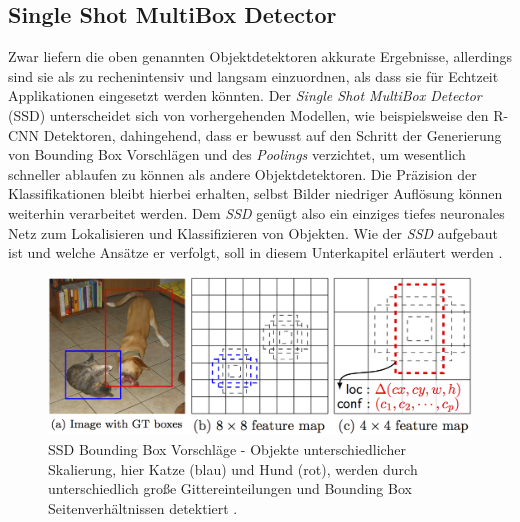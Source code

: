 \subsection*{Single Shot MultiBox Detector}

Zwar liefern die oben genannten Objektdetektoren akkurate Ergebnisse, allerdings sind sie als zu rechenintensiv und langsam einzuordnen, als dass sie für Echtzeit Applikationen eingesetzt werden könnten. Der \textit{Single Shot MultiBox Detector} (SSD) unterscheidet sich von vorhergehenden Modellen, wie beispielsweise den R-CNN Detektoren, dahingehend, dass er bewusst auf den Schritt der Generierung von Bounding Box Vorschlägen und des \textit{Poolings} verzichtet, um wesentlich schneller ablaufen zu können als andere Objektdetektoren. Die Präzision der Klassifikationen bleibt hierbei erhalten, selbst Bilder niedriger Auflösung können weiterhin verarbeitet werden. Dem \textit{SSD} genügt also ein einziges tiefes neuronales Netz zum Lokalisieren und Klassifizieren von Objekten. Wie der \textit{SSD} aufgebaut ist und welche Ansätze er verfolgt, soll in diesem Unterkapitel erläutert werden \cite{ssd.20161229}. 

\begin{figure}[ht]
	\begin{center}
		\includegraphics[width=15cm]{Bilder/ssd_framework.png} 
		\caption[SSD Bounding Box Vorschläge]{SSD Bounding Box Vorschläge - Objekte unterschiedlicher Skalierung, hier Katze (blau) und Hund (rot), werden durch unterschiedlich große Gittereinteilungen und Bounding Box Seitenverhältnissen detektiert \cite{ssd.20161229}.}
		\label{framework}
	\end{center}
\end{figure}

